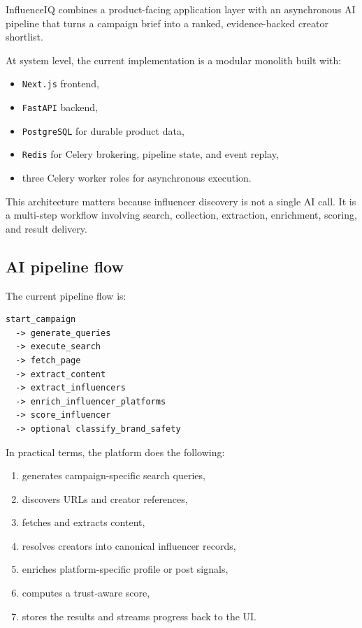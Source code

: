 \documentclass[11pt,a4paper]{article}
\begin{document}
InfluenceIQ combines a product-facing application layer with an asynchronous AI pipeline that turns a campaign brief into a ranked, evidence-backed creator shortlist.

At system level, the current implementation is a modular monolith built with:

\begin{itemize}
  \item \texttt{Next.js} frontend,
  \item \texttt{FastAPI} backend,
  \item \texttt{PostgreSQL} for durable product data,
  \item \texttt{Redis} for Celery brokering, pipeline state, and event replay,
  \item three Celery worker roles for asynchronous execution.
\end{itemize}

This architecture matters because influencer discovery is not a single AI call. It is a multi-step workflow involving search, collection, extraction, enrichment, scoring, and result delivery.

\subsection{AI pipeline flow}

The current pipeline flow is:

\begin{Verbatim}[fontsize=\small,frame=single,framesep=4mm]
start_campaign
  -> generate_queries
  -> execute_search
  -> fetch_page
  -> extract_content
  -> extract_influencers
  -> enrich_influencer_platforms
  -> score_influencer
  -> optional classify_brand_safety
\end{Verbatim}

In practical terms, the platform does the following:

\begin{enumerate}
  \item generates campaign-specific search queries,
  \item discovers URLs and creator references,
  \item fetches and extracts content,
  \item resolves creators into canonical influencer records,
  \item enriches platform-specific profile or post signals,
  \item computes a trust-aware score,
  \item stores the results and streams progress back to the UI.
\end{enumerate}
\end{document}
